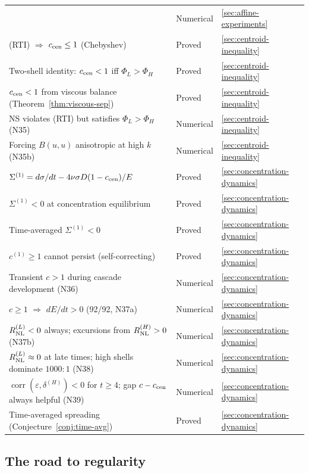 \documentclass[11pt]{article}
\theoremstyle{definition}
\DeclareMathOperator{\corr}{corr}
\begin{document}
\begin{center}
\begin{tabular}{@{}lll@{}}
  & Numerical & \ref{sec:affine-experiments} \\
(RTI) $\Rightarrow$ $c_{\rm cen}\leq 1$ (Chebyshev)
  & Proved & \ref{sec:centroid-inequality} \\
Two-shell identity: $c_{\rm cen}<1$ iff $\Phi_L>\Phi_H$
  & Proved & \ref{sec:centroid-inequality} \\
$c_{\rm cen}<1$ from viscous balance
  (Theorem~\ref{thm:viscous-sep})
  & Proved & \ref{sec:centroid-inequality} \\
NS violates (RTI) but satisfies $\Phi_L>\Phi_H$ (N35)
  & Numerical & \ref{sec:centroid-inequality} \\
Forcing $B(u,u)$ anisotropic at high $k$ (N35b)
  & Numerical & \ref{sec:centroid-inequality} \\
$\Sigma^{(1)}=d\sigma/dt-4\nu\sigma D(1-c_{\rm cen})/E$
  & Proved & \ref{sec:concentration-dynamics} \\
$\Sigma^{(1)}<0$ at concentration equilibrium
  & Proved & \ref{sec:concentration-dynamics} \\
Time-averaged $\Sigma^{(1)}<0$
  & Proved & \ref{sec:concentration-dynamics} \\
$c^{(1)}\geq 1$ cannot persist (self-correcting)
  & Proved & \ref{sec:concentration-dynamics} \\
Transient $c>1$ during cascade development (N36)
  & Numerical & \ref{sec:concentration-dynamics} \\
$c\geq 1$ $\Rightarrow$ $dE/dt>0$ (92/92, N37a)
  & Numerical & \ref{sec:concentration-dynamics} \\
$R_{\rm NL}^{(L)}<0$ always; excursions from
  $R_{\rm NL}^{(H)}>0$ (N37b)
  & Numerical & \ref{sec:concentration-dynamics} \\
$R_{\rm NL}^{(L)}\approx 0$ at late times;
  high shells dominate $1000{:}1$ (N38)
  & Numerical & \ref{sec:concentration-dynamics} \\
$\corr(\varepsilon,\delta^{(H)})<0$ for $t\geq 4$;
  gap $c-c_{\rm cen}$ always helpful (N39)
  & Numerical & \ref{sec:concentration-dynamics} \\
Time-averaged spreading (Conjecture~\ref{conj:time-avg})
  & Proved & \ref{sec:concentration-dynamics} \\
\bottomrule
\end{tabular}
\end{center}

\subsection*{The road to regularity}
\end{document}
